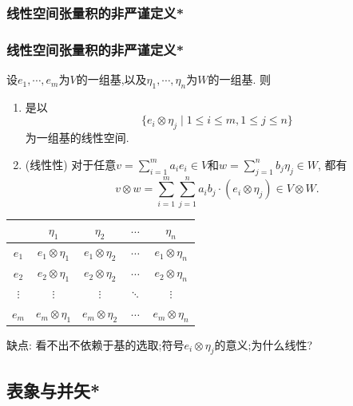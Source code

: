 \subsubsection{线性空间张量积的非严谨定义*}
\begin{frame}\frametitle{线性空间张量积的非严谨定义*}
\begin{proposition}[张量积的一种简单描述]
设$e_1,\cdots,e_m$为$V$的一组基,以及$\eta_1,\cdots,\eta_n$为$W$的一组基.
\pp
则
\begin{enumerate}
\item {} 是以
\[\{e_i\otimes \eta_j\mid 1\leq i \leq m, 1\leq j \leq n\}\]
为一组基的线性空间.
\pp
\item (线性性) 对于任意$v=\sum\limits_{i=1}^{m}a_ie_i\in V$和$w=\sum\limits_{j=1}^{n} b_j\eta_j\in W$, 都有
\[v\otimes w = \sum_{i=1}^{m} \sum_{j=1}^{n} a_ib_j \cdot (e_i\otimes\eta_j)\in V\otimes W.\]
\end{enumerate}
\end{proposition}
\pp

\begin{center}
\begin{tabular}{c|cccc}
 & $\eta_1$  & $\eta_2$ & $\cdots$ & $\eta_n$ \\ \hline
 $e_1$ & $e_1\otimes\eta_1$ &$e_1\otimes\eta_2$  & $\cdots$ & $e_1\otimes\eta_n$ \\
 $e_2$ & $e_2\otimes\eta_1$ &$e_2\otimes\eta_2$  & $\cdots$ & $e_2\otimes\eta_n$ \\
 $\vdots$ &  $\vdots$ &  $\vdots$ &  $\ddots$ &  $\vdots$ \\
$e_m$ & $e_m\otimes\eta_1$ &$e_m\otimes\eta_2$  & $\cdots$ & $e_m\otimes\eta_n$  \\
\end{tabular}
\end{center}
\pp

缺点: 看不出不依赖于基的选取;符号$e_i\otimes \eta_j$的意义;为什么线性?
\end{frame}



\subsection{表象与并矢*}



